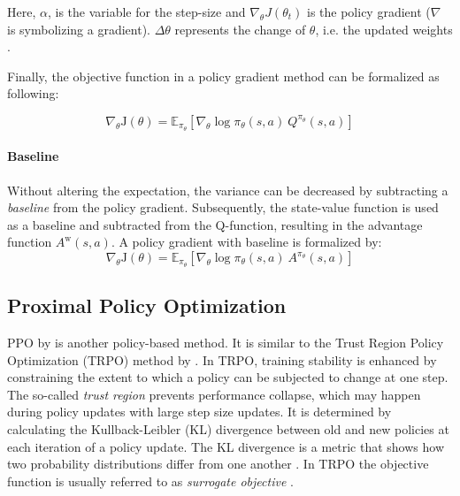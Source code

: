 Here, $\alpha$, is the variable for the step-size and $\nabla_\theta J(\theta_t)$ is the policy gradient ($\nabla$ is symbolizing a gradient). $\Delta \theta$ represents the change of $\theta$, i.e. the updated weights \cite{richardsutton2018}.

Finally, the objective function in a policy gradient method can be formalized as following:

\begin{equation}
\nabla_{\theta} \mathrm{J}(\theta) = \mathbb{E}_{\pi_{\theta}} [\nabla_{\theta}  \log \pi_{\theta} (s,a)\: Q^{\pi_{\theta}} (s, a)]
\label{eq:reinforce}
\end{equation}
 

\paragraph{Baseline}
Without altering the expectation, the variance can be decreased by subtracting a \textit{baseline} from the policy gradient. Subsequently, the state-value function is used as a baseline and subtracted from the Q-function, resulting in the advantage function $A^\mathrm{w}(s,a)$. A policy gradient with baseline is formalized by:
\begin{equation}
\nabla_{\theta} \mathrm{J}(\theta) = \mathbb{E}_{\pi_{\theta}} [\nabla_{\theta}  \log \pi_{\theta} (s,a)\: A^{\pi_{\theta}} (s,a)]
\label{eq:reinforce_base}
\end{equation}





\subsection{Proximal Policy Optimization}
\label{ssec:ppo}

PPO by  is another policy-based method. It is similar to the Trust Region Policy Optimization (TRPO) method by . In TRPO, training stability is enhanced by constraining the extent to which a policy can be subjected to change at one step. The so-called \textit{trust region} prevents performance collapse, which may happen during policy updates with large step size updates. It is determined by calculating the Kullback-Leibler (KL) divergence between old and new policies at each iteration of a policy update. The KL divergence is a metric that shows how two probability distributions differ from one another . In TRPO the objective function is usually referred to as \textit{surrogate objective} \cite{schulman2015trust}.

